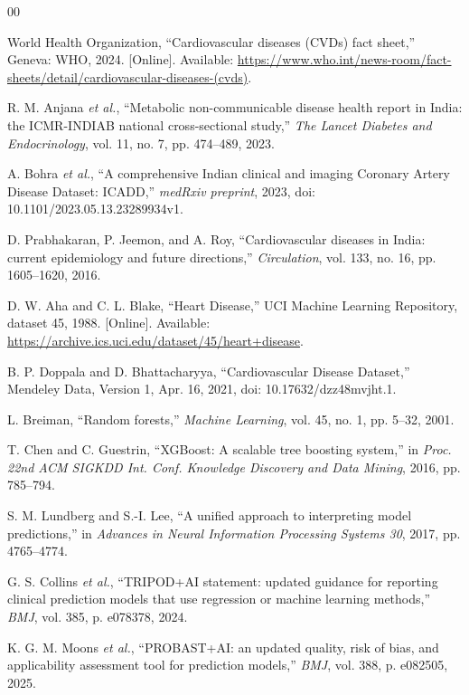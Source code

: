 \documentclass[conference]{IEEEtran}
\begin{document}
\begin{thebibliography}{00}

World Health Organization, ``Cardiovascular diseases (CVDs) fact sheet,'' Geneva: WHO, 2024. [Online]. Available: \url{https://www.who.int/news-room/fact-sheets/detail/cardiovascular-diseases-(cvds)}.

R. M. Anjana \emph{et al.}, ``Metabolic non-communicable disease health report in India: the ICMR-INDIAB national cross-sectional study,'' \emph{The Lancet Diabetes and Endocrinology}, vol. 11, no. 7, pp. 474--489, 2023.

A. Bohra \emph{et al.}, ``A comprehensive Indian clinical and imaging Coronary Artery Disease Dataset: ICADD,'' \emph{medRxiv preprint}, 2023, doi: 10.1101/2023.05.13.23289934v1.

D. Prabhakaran, P. Jeemon, and A. Roy, ``Cardiovascular diseases in India: current epidemiology and future directions,'' \emph{Circulation}, vol. 133, no. 16, pp. 1605--1620, 2016.

D. W. Aha and C. L. Blake, ``Heart Disease,'' UCI Machine Learning Repository, dataset 45, 1988. [Online]. Available: \url{https://archive.ics.uci.edu/dataset/45/heart+disease}.

B. P. Doppala and D. Bhattacharyya, ``Cardiovascular Disease Dataset,'' Mendeley Data, Version 1, Apr. 16, 2021, doi: 10.17632/dzz48mvjht.1.

L. Breiman, ``Random forests,'' \emph{Machine Learning}, vol. 45, no. 1, pp. 5--32, 2001.

T. Chen and C. Guestrin, ``XGBoost: A scalable tree boosting system,'' in \emph{Proc. 22nd ACM SIGKDD Int. Conf. Knowledge Discovery and Data Mining}, 2016, pp. 785--794.

S. M. Lundberg and S.-I. Lee, ``A unified approach to interpreting model predictions,'' in \emph{Advances in Neural Information Processing Systems 30}, 2017, pp. 4765--4774.

G. S. Collins \emph{et al.}, ``TRIPOD+AI statement: updated guidance for reporting clinical prediction models that use regression or machine learning methods,'' \emph{BMJ}, vol. 385, p. e078378, 2024.

K. G. M. Moons \emph{et al.}, ``PROBAST+AI: an updated quality, risk of bias, and applicability assessment tool for prediction models,'' \emph{BMJ}, vol. 388, p. e082505, 2025.


\end{thebibliography}
\end{document}
